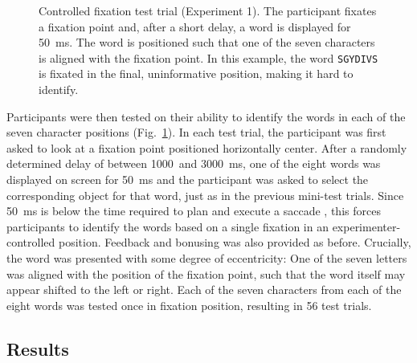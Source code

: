 \documentclass[doc,biblatex]{apa7}
\begin{document}
\begin{figure}
\vspace*{2pt}
\caption{Controlled fixation test trial (Experiment 1). The participant fixates a fixation point and, after a short delay, a word is displayed for 50~ms. The word is positioned such that one of the seven characters is aligned with the fixation point. In this example, the word \texttt{SGYDIVS} is fixated in the final, uninformative position, making it hard to identify.}
\label{fig04}
\end{figure}

Participants were then tested on their ability to identify the words in each of the seven character positions (Fig.~\ref{fig04}). In each test trial, the participant was first asked to look at a fixation point positioned horizontally center. After a randomly determined delay of between 1000~and 3000~ms, one of the eight words was displayed on screen for 50~ms and the participant was asked to select the corresponding object for that word, just as in the previous mini-test trials. Since 50~ms is below the time required to plan and execute a saccade \parencite{Rayner:1998}, this forces participants to identify the words based on a single fixation in an experimenter-controlled position. Feedback and bonusing was also provided as before. Crucially, the word was presented with some degree of eccentricity: One of the seven letters was aligned with the position of the fixation point, such that the word itself may appear shifted to the left or right. Each of the seven characters from each of the eight words was tested once in fixation position, resulting in 56 test trials.

\subsection{Results}
\end{document}
